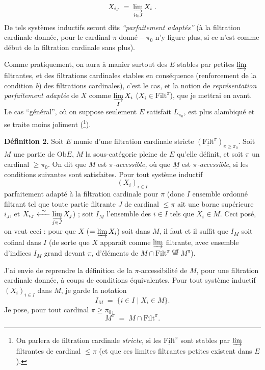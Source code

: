 \documentclass[11pt]{article}
\newcommand{\printedpage}[1]{\marginpar{\footnotesize p.~#1}}
\newcommand{\msp}[1]{\marginpar{\footnotesize [#1]}}
\newcommand{\Ob}{\mathrm{Ob}}
\newcommand{\Filt}{\mathrm{Filt}}
\begin{document}
\printedpage{47}
\msp{page 86}
\[
X_{i_J} \;=\; \varinjlim_{i\in J} X_i \;.
\]
De tels systèmes inductifs seront dits \textit{“parfaitement adaptés”} (à la filtration cardinale donnée, pour le cardinal $\pi$ donné – $\pi_0$ n'y figure plus, si ce n'est comme début de la filtration cardinale sans plus).

Comme pratiquement, on aura à manier surtout des $E$ stables par petites $\varinjlim$ filtrantes, et des filtrations cardinales stables en conséquence (renforcement de la condition \textit{b}) des filtrations cardinales), c'est le cas, et la notion de \textit{représentation parfaitement adaptée} de $X$ comme $\varinjlim\limits_{I} X_i$ ($X_i\in\Filt^\pi$), que je mettrai en avant. Le cas “général”, où on suppose seulement $E$ satisfait $L_{\pi_0}$, est plus alambiqué et se traite moins joliment (\footnote[41]{On parlera de filtration cardinale \textit{stricte,} si les $\underline{\Filt}^\pi$ sont stables par $\varinjlim$ filtrantes de cardinal $\le\pi$ (et que ces limites filtrantes petites existent dans $E$).}).

\textbf{Définition 2.} Soit $E$ munie d'une filtration cardinale stricte $(\underline{\Filt}^\pi)_{\pi\ge\pi_0}$. Soit $M$ une partie de $\Ob E$, $\underline{M}$ la sous-catégorie pleine de $E$ qu'elle définit, et soit $\pi$ un cardinal $\ge\pi_0$. On dit que $M$ est \textit{$\pi$-accessible,} où que $\underline{M}$ est \textit{$\pi$-accessible}, %
\msp{page 87}
si les conditions suivantes sont satisfaites. Pour tout système inductif
\[
(X_i)_{i\in I}
\]
parfaitement adapté à la filtration cardinale pour $\pi$ (donc $I$ ensemble ordonné filtrant tel que toute partie filtrante $J$ de cardinal $\le\pi$ ait une borne supérieure $i_J$, et $X_{i_J}\xleftarrow{\ \sim\ }\varinjlim\limits_{j\in J} X_j$) ; soit $I_M$ l'ensemble des $i\in I$ tels que $X_i\in M$. Ceci posé, on veut ceci : pour que $X$ ($=\varinjlim X_i$) soit dans $M$, il faut et il suffit que $I_M$ soit cofinal dans $I$ (de sorte que $X$ apparaît comme $\varinjlim$ filtrante, avec ensemble d'indices $I_M$ grand devant $\pi$, d'éléments de $M\cap\underline{\Filt}^\pi\overset{\text{déf}}{=}M^\pi$).

\msp{page 88}
J'ai envie de reprendre la définition de la $\pi$-accessibilité de $M$, pour une filtration cardinale donnée, à coups de conditions équivalentes. Pour tout système inductif $(X_i)_{i\in I}$ dans $M$, je garde la notation
\[
I_M \;=\; \{i\in I \mid X_i\in M\}.
\]
Je pose, pour tout cardinal $\pi\ge\pi_0$,
\[
M^\pi \;=\; M\cap\Filt^\pi .
\]
\end{document}
